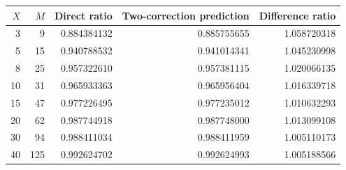 \begin{tabular}{rrrrr}
\toprule
$X$ & $M$ & Direct ratio & Two-correction prediction & Difference ratio \\
\midrule
3 & 9 & 0.884384132 & 0.885755655 & 1.058720318 \\
5 & 15 & 0.940788532 & 0.941014341 & 1.045230998 \\
8 & 25 & 0.957322610 & 0.957381115 & 1.020066135 \\
10 & 31 & 0.965933363 & 0.965956404 & 1.016339718 \\
15 & 47 & 0.977226495 & 0.977235012 & 1.010632293 \\
20 & 62 & 0.987744918 & 0.987748000 & 1.013099108 \\
30 & 94 & 0.988411034 & 0.988411959 & 1.005110173 \\
40 & 125 & 0.992624702 & 0.992624993 & 1.005188566 \\
\bottomrule
\end{tabular}

